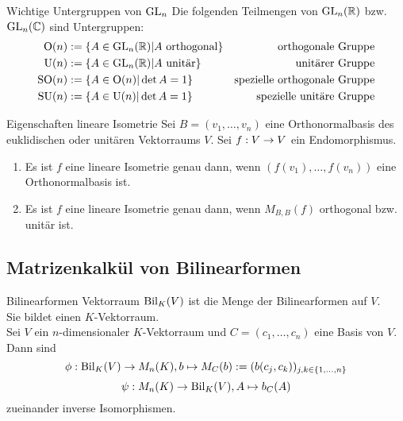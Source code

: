 \documentclass[main.tex]{subfiles}
\begin{document}
\begin{karte}{Wichtige Untergruppen von \(\operatorname{GL}_n\)}
    Die folgenden Teilmengen von \(\operatorname{GL}_n(\mathbb{R})\) bzw. \(\operatorname{GL}_n(\mathbb{C})\) sind Untergruppen:
    \begin{align*}
        \mathrm{O}(n) &:= \{A \in \operatorname{GL}_n(\mathbb{R}) \vert A \text{ orthogonal}\} &\text{orthogonale Gruppe}\\
        \mathrm{U}(n) &:= \{A \in \operatorname{GL}_n(\mathbb{R}) \vert A \text{ unitär}\} &\text{unitärer Gruppe}\\
        \mathrm{SO}(n) &:= \{A \in \mathrm{O}(n) \vert \det A = 1\} &\text{spezielle orthogonale Gruppe}\\
        \mathrm{SU}(n) &:= \{A \in \mathrm{U}(n) \vert \det A = 1\} &\text{spezielle unitäre Gruppe}
    \end{align*}
\end{karte}

\begin{karte}{Eigenschaften lineare Isometrie}
    Sei \(B = (v_1, \ldots, v_n)\) eine Orthonormalbasis des euklidischen oder unitären 
    Vektorraums \(V\). Sei \(f : V \rightarrow V\) ein Endomorphismus.
    \begin{enumerate}
        \item Es ist \(f\) eine lineare Isometrie genau dann, wenn \((f(v_1), \ldots, f(v_n))\)
        eine Orthonormalbasis ist.
        \item Es ist \(f\) eine lineare Isometrie genau dann, wenn \(M_{B,B}(f)\) orthogonal 
        bzw. unitär ist.
    \end{enumerate}
\end{karte}

\subsection*{Matrizenkalkül von Bilinearformen}

\begin{karte}{Bilinearformen Vektorraum}
    \( \operatorname{Bil}_K(V) \) ist die Menge der 
    Bilinearformen auf \( V \). \\
    Sie bildet einen \( K \)-Vektorraum.\\
    Sei \( V \) ein \(n\)-dimensionaler \(K\)-Vektorraum 
    und \( C=(c_1, \ldots, c_n) \) eine Basis von \(V\).
    Dann sind  
    \[ \phi : \operatorname{Bil}_K(V) \rightarrow M_n(K), b\mapsto M_C(b) := (b(c_j, c_k))_{j,k\in\{1,\ldots,n\}} \]
    \[ \psi : M_n(K) \rightarrow \operatorname{Bil}_K(V), A \mapsto b_C(A) \]
    zueinander inverse Isomorphismen.
\end{karte}
\end{document}
